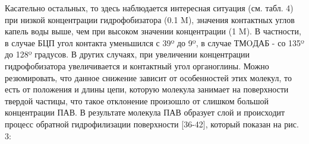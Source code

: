 \begin{multicols}{2}
Касательно остальных, то здесь наблюдается интересная ситуация (см.
табл. 4) при низкой концентрации гидрофобизатора (0.1 M), значения
контактных углов капель воды выше, чем при высоком значении концентрации
(1 M). В частности, в случае БЦП угол контакта уменьшился с 39º до 9º, в
случае ТМOДАБ - со 135º до 128º градусов. В других случаях, при
увеличении концентрации гидрофобизатора увеличивается и контактный угол
органоглины. Можно резюмировать, что данное снижение зависит от
особенностей этих молекул, то есть от положения и длины цепи, которую
молекула занимает на поверхности твердой частицы, что такое отклонение
произошло от слишком большой концентрации ПАВ. В результате молекула ПАВ
образует слой и происходит процесс обратной гидрофилизации поверхности
{[}36-42{]}, который показан на рис. 3:
\end{multicols}

